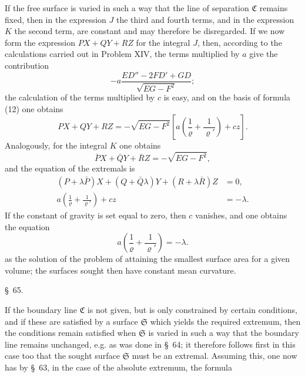\documentclass[11pt,a4paper,leqno]{article}
\begin{document}
If the free surface is varied in such a way that the line of separation
$\mathfrak{C}$ remains fixed, then in the expression $J$ the third and fourth terms,
and in the expression $K$ the second term, are constant and may therefore
be disregarded. If we now form the expression $PX+QY+RZ$ for the
integral $J$, then, according to the calculations carried out in Problem XIV,
the terms multiplied by $a$ give the contribution
\[
-a\frac{ED''-2FD'+GD}{\sqrt{EG-F^2}};
\]
the calculation of the terms multiplied by $c$ is easy, and on the basis
of formula (12) one obtains
\[
PX+QY+RZ=-\sqrt{EG-F^2}
\left[a\left(\frac{1}{\varrho}+\frac{1}{\varrho'}\right)+cz\right].
\]
Analogously, for the integral $K$ one obtains
\[
\bar PX+\bar QY+\bar RZ=-\sqrt{EG-F^2},
\]
and the equation of the extremals is
\[
\begin{aligned}
(P+\lambda\bar P)X+(Q+\bar Q\lambda)Y+(R+\lambda\bar R)Z&=0,\\
a\left(\frac{1}{\varrho}+\frac{1}{\varrho'}\right)+cz&=-\lambda.
\end{aligned}
\]
If the constant of gravity is set equal to zero, then $c$ vanishes,
and one obtains the equation
\[
a\left(\frac{1}{\varrho}+\frac{1}{\varrho'}\right)=-\lambda.
\]
as the solution of the problem of attaining the smallest surface area for
a given volume; the surfaces sought then have constant mean curvature.


\begin{center}
{\large \S~65.}
\end{center}

If the boundary line $\mathfrak{C}$ is not given, but is only constrained by
certain conditions, and if these are satisfied by a surface $\mathfrak{S}$
which yields the required extremum, then the conditions remain satisfied when
$\mathfrak{S}$ is varied in such a way that the boundary line remains
unchanged, e.g. as was done in \S~64; it therefore follows first in this case
too that the sought surface $\mathfrak{S}$ must be an extremal. Assuming this,
one now has by \S~63, in the case of the absolute extremum, the formula
\end{document}
